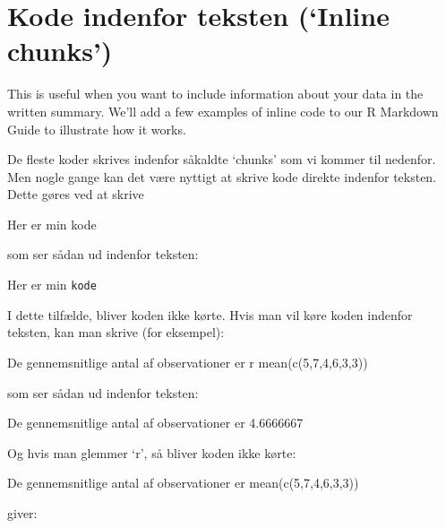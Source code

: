 \documentclass[
]{book}
\newenvironment{Shaded}{\begin{snugshade}}{\end{snugshade}}
\newcommand{\AttributeTok}[1]{\textcolor[rgb]{0.77,0.63,0.00}{#1}}
\newcommand{\NormalTok}[1]{#1}
\newcommand{\StringTok}[1]{\textcolor[rgb]{0.31,0.60,0.02}{#1}}
\begin{document}
\hypertarget{kode-indenfor-teksten-inline-chunks}{%
\section{Kode indenfor teksten (`Inline chunks')}\label{kode-indenfor-teksten-inline-chunks}}

This is useful when you want to include information about your data in the written summary. We'll add a few examples of inline code to our R Markdown Guide to illustrate how it works.

De fleste koder skrives indenfor såkaldte `chunks' som vi kommer til nedenfor. Men nogle gange kan det være nyttigt at skrive kode direkte indenfor teksten. Dette gøres ved at skrive

\begin{Shaded}
\begin{Highlighting}[]
\NormalTok{Her er min }\StringTok{\textasciigrave{}}\AttributeTok{kode}\StringTok{\textasciigrave{}}
\end{Highlighting}
\end{Shaded}

som ser sådan ud indenfor teksten:

Her er min \texttt{kode}

I dette tilfælde, bliver koden ikke kørte. Hvis man vil køre koden indenfor teksten, kan man skrive (for eksempel):

\begin{Shaded}
\begin{Highlighting}[]
\NormalTok{De gennemsnitlige antal af observationer er }\StringTok{\textasciigrave{}}\AttributeTok{r mean(c(5,7,4,6,3,3))}\StringTok{\textasciigrave{}}
\end{Highlighting}
\end{Shaded}

som ser sådan ud indenfor teksten:

De gennemsnitlige antal af observationer er 4.6666667

Og hvis man glemmer `r', så bliver koden ikke kørte:

\begin{Shaded}
\begin{Highlighting}[]
\NormalTok{De gennemsnitlige antal af observationer er }\StringTok{\textasciigrave{}}\AttributeTok{mean(c(5,7,4,6,3,3))}\StringTok{\textasciigrave{}}
\end{Highlighting}
\end{Shaded}

giver:
\end{document}
